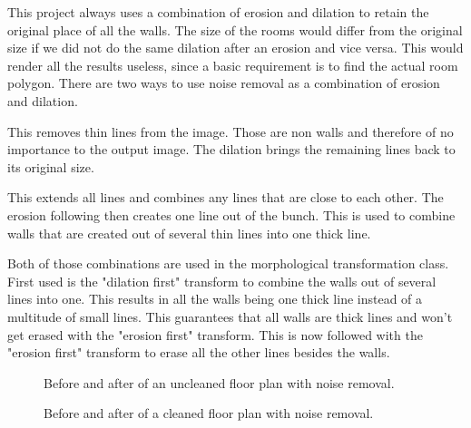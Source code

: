 This project always uses a combination of erosion and dilation to retain the original place of all the walls. The size of the rooms would differ from the original size if we did not do the same dilation after an erosion and vice versa. This would render all the results useless, since a basic requirement is to find the actual room polygon. There are two ways to use noise removal as a combination of erosion and dilation. 

\begin{description}[style=nextline]
	\item[Erosion first] This removes thin lines from the image. Those are non walls and therefore of no importance to the output image. The dilation brings the remaining lines back to its original size.
	\item[Dilation first] This extends all lines and combines any lines that are close to each other. The erosion following then creates one line out of the bunch. This is used to combine walls that are created out of several thin lines into one thick line.
\end{description}

Both of those combinations are used in the morphological transformation class. First used is the "dilation first" transform to combine the walls out of several lines into one. This results in all the walls being one thick line instead of a multitude of small lines. This guarantees that all walls are thick lines and won't get erased with the "erosion first" transform. This is now followed with the "erosion first" transform to erase all the other lines besides the walls. 

\begin{figure}[h]
	\centering
	\hfill
	\caption{Before and after of an uncleaned floor plan with noise removal. }
\end{figure}

\begin{figure}[h]
	\centering
	\hfill
	\caption{Before and after of a cleaned floor plan with noise removal.}
\end{figure}

